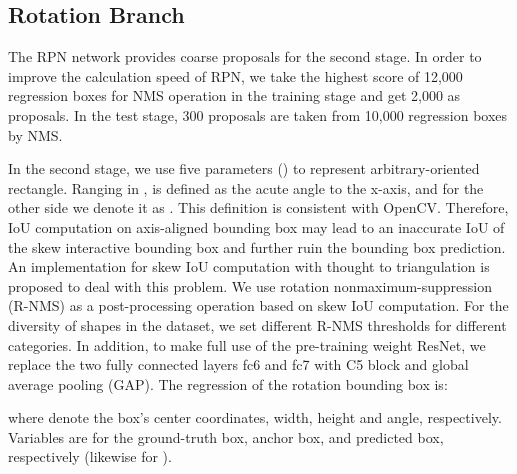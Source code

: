 \documentclass[10pt,twocolumn,letterpaper]{article}
\begin{document}
	\subsection{Rotation Branch}
	The RPN network provides coarse proposals for the second stage. In order to improve the calculation speed of RPN, we take the highest score of 12,000 regression boxes for NMS operation in the training stage and get 2,000 as proposals. In the test stage, 300 proposals are taken from 10,000 regression boxes by NMS.
	
	In the second stage, we use five parameters () to represent arbitrary-oriented rectangle. Ranging in ,  is defined as the acute angle to the x-axis, and for the other side we denote it as . This definition is consistent with OpenCV. Therefore, IoU computation on axis-aligned bounding box may lead to an inaccurate IoU of the skew interactive bounding box and further ruin the bounding box prediction. An implementation for skew IoU computation \cite{ma2018arbitrary} with thought to triangulation is proposed to deal with this problem. We use rotation nonmaximum-suppression (R-NMS) as a post-processing operation based on skew IoU computation. For the diversity of shapes in the dataset, we set different R-NMS thresholds for different categories. In addition, to make full use of the pre-training weight ResNet, we replace the two fully connected layers fc6 and fc7 with C5 block and global average pooling (GAP). The regression of the rotation bounding box is:
	
	
	where  denote the box's center coordinates, width, height and angle, respectively. Variables  are for the ground-truth box, anchor box, and predicted box, respectively (likewise for ).
	
\end{document}
